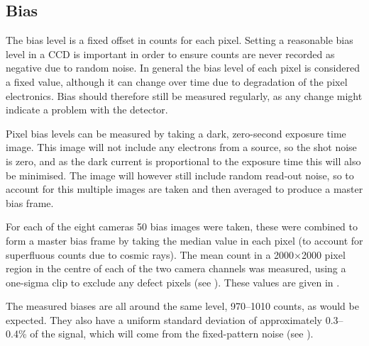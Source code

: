 \begin{colsection}
\begin{colsection}
\clearpage

\end{colsection}

\newpage
\subsection{Bias}
\label{sec:bias}
\begin{colsection}

The bias level is a fixed offset in counts for each pixel. Setting a reasonable bias level in a CCD is important in order to ensure counts are never recorded as negative due to random noise. In general the bias level of each pixel is considered a fixed value, although it can change over time due to degradation of the pixel electronics. Bias should therefore still be measured regularly, as any change might indicate a problem with the detector.

Pixel bias levels can be measured by taking a dark, zero-second exposure time image. This image will not include any electrons from a source, so the shot noise is zero, and as the dark current is proportional to the exposure time this will also be minimised. The image will however still include random read-out noise, so to account for this multiple images are taken and then averaged to produce a master bias frame.

For each of the eight cameras 50 bias images were taken, these were combined to form a master bias frame by taking the median value in each pixel (to account for superfluous counts due to cosmic rays). The mean count in a 2000$\times$2000 pixel region in the centre of each of the two camera channels was measured, using a one-sigma clip to exclude any defect pixels (see ). These values are given in .

The measured biases are all around the same level, 970--1010 counts, as would be expected. They also have a uniform standard deviation of approximately 0.3--0.4\% of the signal, which will come from the fixed-pattern noise (see ).


\end{colsection}
\end{colsection}
